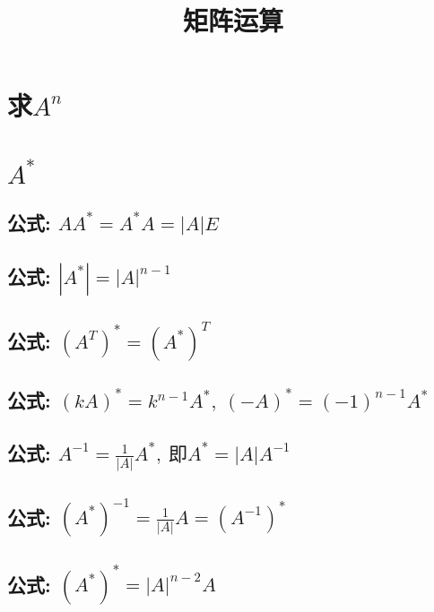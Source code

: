 \documentclass[UTF8]{ctexart}
\title{矩阵运算}
\begin{document}
	\tableofcontents %
	\date{} %
	\maketitle  %
	
	
	\section{求$A^n$}
	
	
	\section{$A^*$}
	

		\subsection{公式: $AA^*=A^*A=\left| A \right|E			$} 
		

		\subsection{公式: $\left| A^* \right|=\left| A \right|^{n-1}			$} 
		

		\subsection{公式: $\left( A^T \right) ^*=\left( A^* \right) ^T			$} 
		

		\subsection{公式: $\left( kA \right) ^*=k^{n-1}A^*,\ \left( -A \right) ^*=\left( -1 \right) ^{n-1}A^*			$} 
		

		\subsection{公式: $A^{-1}=\frac{1}{\left| A \right|}A^*,\ \text{即}A^*=\left| A \right|A^{-1}			$} 
		

		\subsection{公式: $\left( A^* \right) ^{-1}=\frac{1}{\left| A \right|}A=\left( A^{-1} \right) ^*			$} 
		

		\subsection{公式: $\left( A^* \right) ^*=\left| A \right|^{n-2}A			$} 
		
\end{document}
